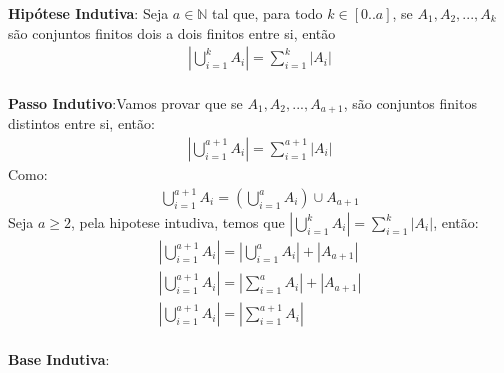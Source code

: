 \textbf{Hipótese Indutiva}: Seja $a \in \mathbb{N}$ tal que, para todo $k \in [0..a]$, se $A_{1}, A_{2}, ..., A_{k}$ são conjuntos finitos dois a dois finitos entre si, então
\begin{eqnarray*}
|\bigcup_{i=1}^k A_{i}| = \sum_{i=1}^k |A_{i}|
\end{eqnarray*}
\\
\textbf{Passo Indutivo}:Vamos provar que se $A_{1},A_{2}, ..., A_{a+1}$, são conjuntos finitos distintos entre si, então:
\begin{eqnarray*}
|\bigcup_{i=1}^{a+1} A_{i}| = \sum_{i=1}^{a+1} |A_{i}|
\end{eqnarray*}
Como:
\begin{eqnarray*}
\bigcup_{i=1}^{a+1} A_{i} = (\bigcup_{i=1}^{a} A_{i}) \cup A_{a+1} 
\end{eqnarray*}
Seja $a \geq 2$, pela hipotese intudiva, temos que $|\bigcup_{i=1}^k A_{i}| = \sum_{i=1}^k |A_{i}|$, então:
\begin{eqnarray*}
|\bigcup_{i=1}^{a+1} A_{i}| = |\bigcup_{i=1}^{a} A_{i}| + |A_{a+1}| \\
|\bigcup_{i=1}^{a+1} A_{i}| = |\sum_{i=1}^{a} A_{i}| + |A_{a+1}| \\
|\bigcup_{i=1}^{a+1} A_{i}| = |\sum_{i=1}^{a+1} A_{i}| 
\end{eqnarray*}
\\
\textbf{Base Indutiva}: